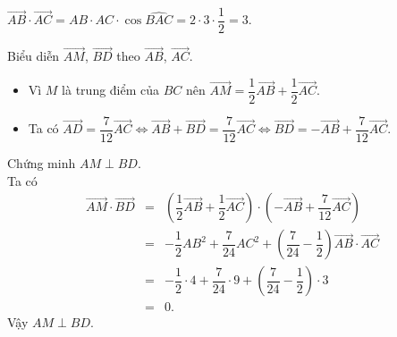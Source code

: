 \begin{bt}
{\begin{center}
\begin{tikzpicture}[scale=1, font=\footnotesize, line join=round, line cap=round, >=stealth]
\end{tikzpicture}
		\end{center}
		\begin{listEX}[1]
			\item $\overrightarrow{AB} \cdot \overrightarrow{AC} = AB \cdot AC \cdot \cos \widehat{BAC} = 2 \cdot 3 \cdot \dfrac{1}{2} = 3$.
			\item Biểu diễn $\overrightarrow{AM}$, $\overrightarrow{BD}$ theo $\overrightarrow{AB}$, $\overrightarrow{AC}$.
			\begin{itemize}
				\item Vì $M$ là trung điểm của $BC$ nên $\overrightarrow{AM} = \dfrac{1}{2} \overrightarrow{AB} + \dfrac{1}{2}\overrightarrow{AC}$.
				\item Ta có $\overrightarrow{AD} = \dfrac{7}{12} \overrightarrow{AC} \Leftrightarrow \overrightarrow{AB} + \overrightarrow{BD}= \dfrac{7}{12} \overrightarrow{AC} \Leftrightarrow  \overrightarrow{BD}= -\overrightarrow{AB} + \dfrac{7}{12} \overrightarrow{AC}$.
			\end{itemize}
			\item  Chứng minh $AM \perp BD $.\\
			Ta có  
			\begin{eqnarray*}
				\overrightarrow{AM} \cdot \overrightarrow{BD} &=& \left( \dfrac{1}{2} \overrightarrow{AB} + \dfrac{1}{2}\overrightarrow{AC}\right) \cdot \left( -\overrightarrow{AB} + \dfrac{7}{12} \overrightarrow{AC} \right) \\
				&= &  -\dfrac{1}{2} AB^2 + \dfrac{7}{24}AC^2 + \left( \dfrac{7}{24} -\dfrac{1}{2}\right) \overrightarrow{AB} \cdot \overrightarrow{AC}\\
				& = &  -\dfrac{1}{2} \cdot 4 + \dfrac{7}{24}\cdot 9 + \left( \dfrac{7}{24} -\dfrac{1}{2}\right) \cdot 3\\
				& = & 0.
			\end{eqnarray*}
			Vậy $AM \perp BD $.
		\end{listEX}
	}
\end{bt}

